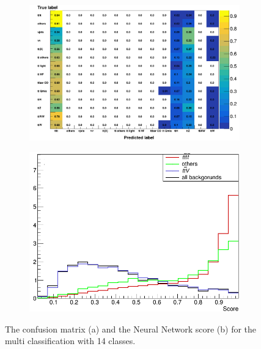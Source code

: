 \begin{figure}[H]
\begin{subfigure}{.55\textwidth}
  \centering
  \includegraphics[width=.99\linewidth]{figs/MultiClass/Cm_unweighted}
  \caption{}
  \label{fig:CMunW}
\end{subfigure}%
\begin{subfigure}{.45\textwidth}
  \centering
  \includegraphics[width=.99\linewidth]{figs/MultiClass/Score_tttt_ttWothers}
  \caption{}
  \label{fig:Score14}
\end{subfigure}
\caption{The confusion matrix (a) and the Neural Network score (b) for the multi classification with 14 classes.}
\label{fig:14Class}
\end{figure}

